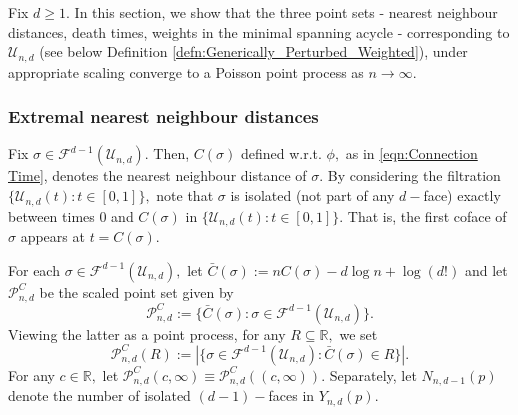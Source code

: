 \documentclass[12pt]{amsart}
\newcommand{\PoiF}{\mathscr{P}_{n, d}^{C}}
\numberwithin{equation}{section}
\numberwithin{theorem}{section}
\newcommand{\Real}{\mathbb R}
\newcommand{\1}{\mathbf{1}}
\def\F{\mathcal{F}}
\def\U{\mathcal{U}}
\begin{document}


Fix $d \geq 1.$ In this section, we show that the three point sets - nearest neighbour distances, death times, weights in the minimal spanning acycle - corresponding to $\U_{n,d}$ (see below Definition \ref{defn:Generically_Perturbed_Weighted}), under appropriate scaling converge to a Poisson point process as $n \to \infty$.



\subsubsection{Extremal nearest neighbour distances}
\label{sec:nnd}

Fix $\sigma \in \F^{d - 1}(\U_{n, d}).$ Then, $C(\sigma)$ defined w.r.t. $\phi,$ as in \eqref{eqn:Connection Time}, denotes the nearest neighbour distance of $\sigma.$ By considering the filtration $\{\U_{n, d}(t) : t \in [0, 1]\},$ note that $\sigma$ is isolated (not part of any $d-$face) exactly between times $0$ and $C(\sigma)$ in $\{\U_{n, d}(t) : t \in [0,1]\}.$ That is, the first coface of $\sigma$ appears at $t = C(\sigma).$ %

For each $\sigma \in \F^{d - 1}(\U_{n, d}),$ let $\bar{C}(\sigma) := n C(\sigma) - d \log n + \log(d!)$ and let $\PoiF$  be the scaled point set given by
%
\begin{equation}
\label{eqn:Scaled_NN_Dist_Process}
\PoiF := \{\bar{C}(\sigma): \sigma \in \F^{d - 1}(\U_{n, d})\}.
\end{equation}
%
Viewing the latter as a point process, for any $R \subseteq \mathbb{R},$ we set
%
\begin{equation}
\label{eqn:PoiFinS}
\PoiF(R) := |\{\sigma \in \F^{d - 1}(\U_{n, d}): \bar{C}(\sigma) \in R\}|.
\end{equation}
%
For any $c \in \Real,$ let $\PoiF(c, \infty) \equiv \PoiF((c, \infty)).$ Separately, let $N_{n, d - 1}(p)$ denote the number of isolated $(d - 1)-$faces in $Y_{n, d}(p).$ 
\end{document}
